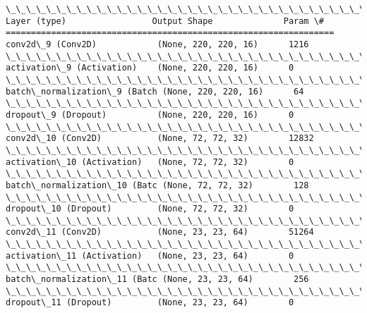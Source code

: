 \documentclass[11pt]{article}
\begin{document}
    \begin{Verbatim}[commandchars=\\\{\}]
\_\_\_\_\_\_\_\_\_\_\_\_\_\_\_\_\_\_\_\_\_\_\_\_\_\_\_\_\_\_\_\_\_\_\_\_\_\_\_\_\_\_\_\_\_\_\_\_\_\_\_\_\_\_\_\_\_\_\_\_\_\_\_\_\_
Layer (type)                 Output Shape              Param \#   
=================================================================
conv2d\_9 (Conv2D)            (None, 220, 220, 16)      1216      
\_\_\_\_\_\_\_\_\_\_\_\_\_\_\_\_\_\_\_\_\_\_\_\_\_\_\_\_\_\_\_\_\_\_\_\_\_\_\_\_\_\_\_\_\_\_\_\_\_\_\_\_\_\_\_\_\_\_\_\_\_\_\_\_\_
activation\_9 (Activation)    (None, 220, 220, 16)      0         
\_\_\_\_\_\_\_\_\_\_\_\_\_\_\_\_\_\_\_\_\_\_\_\_\_\_\_\_\_\_\_\_\_\_\_\_\_\_\_\_\_\_\_\_\_\_\_\_\_\_\_\_\_\_\_\_\_\_\_\_\_\_\_\_\_
batch\_normalization\_9 (Batch (None, 220, 220, 16)      64        
\_\_\_\_\_\_\_\_\_\_\_\_\_\_\_\_\_\_\_\_\_\_\_\_\_\_\_\_\_\_\_\_\_\_\_\_\_\_\_\_\_\_\_\_\_\_\_\_\_\_\_\_\_\_\_\_\_\_\_\_\_\_\_\_\_
dropout\_9 (Dropout)          (None, 220, 220, 16)      0         
\_\_\_\_\_\_\_\_\_\_\_\_\_\_\_\_\_\_\_\_\_\_\_\_\_\_\_\_\_\_\_\_\_\_\_\_\_\_\_\_\_\_\_\_\_\_\_\_\_\_\_\_\_\_\_\_\_\_\_\_\_\_\_\_\_
conv2d\_10 (Conv2D)           (None, 72, 72, 32)        12832     
\_\_\_\_\_\_\_\_\_\_\_\_\_\_\_\_\_\_\_\_\_\_\_\_\_\_\_\_\_\_\_\_\_\_\_\_\_\_\_\_\_\_\_\_\_\_\_\_\_\_\_\_\_\_\_\_\_\_\_\_\_\_\_\_\_
activation\_10 (Activation)   (None, 72, 72, 32)        0         
\_\_\_\_\_\_\_\_\_\_\_\_\_\_\_\_\_\_\_\_\_\_\_\_\_\_\_\_\_\_\_\_\_\_\_\_\_\_\_\_\_\_\_\_\_\_\_\_\_\_\_\_\_\_\_\_\_\_\_\_\_\_\_\_\_
batch\_normalization\_10 (Batc (None, 72, 72, 32)        128       
\_\_\_\_\_\_\_\_\_\_\_\_\_\_\_\_\_\_\_\_\_\_\_\_\_\_\_\_\_\_\_\_\_\_\_\_\_\_\_\_\_\_\_\_\_\_\_\_\_\_\_\_\_\_\_\_\_\_\_\_\_\_\_\_\_
dropout\_10 (Dropout)         (None, 72, 72, 32)        0         
\_\_\_\_\_\_\_\_\_\_\_\_\_\_\_\_\_\_\_\_\_\_\_\_\_\_\_\_\_\_\_\_\_\_\_\_\_\_\_\_\_\_\_\_\_\_\_\_\_\_\_\_\_\_\_\_\_\_\_\_\_\_\_\_\_
conv2d\_11 (Conv2D)           (None, 23, 23, 64)        51264     
\_\_\_\_\_\_\_\_\_\_\_\_\_\_\_\_\_\_\_\_\_\_\_\_\_\_\_\_\_\_\_\_\_\_\_\_\_\_\_\_\_\_\_\_\_\_\_\_\_\_\_\_\_\_\_\_\_\_\_\_\_\_\_\_\_
activation\_11 (Activation)   (None, 23, 23, 64)        0         
\_\_\_\_\_\_\_\_\_\_\_\_\_\_\_\_\_\_\_\_\_\_\_\_\_\_\_\_\_\_\_\_\_\_\_\_\_\_\_\_\_\_\_\_\_\_\_\_\_\_\_\_\_\_\_\_\_\_\_\_\_\_\_\_\_
batch\_normalization\_11 (Batc (None, 23, 23, 64)        256       
\_\_\_\_\_\_\_\_\_\_\_\_\_\_\_\_\_\_\_\_\_\_\_\_\_\_\_\_\_\_\_\_\_\_\_\_\_\_\_\_\_\_\_\_\_\_\_\_\_\_\_\_\_\_\_\_\_\_\_\_\_\_\_\_\_
dropout\_11 (Dropout)         (None, 23, 23, 64)        0         

\end{Verbatim}
\end{document}
